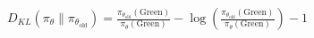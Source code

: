 \documentclass[preview]{standalone}
\begin{document}
\begin{align*}
D_{KL}\left(\pi_\theta \parallel \pi_{\theta_{\text{old}}}\right) = \frac{\pi_{\theta_{\text{old}}}(\text{Green})}{\pi_\theta(\text{Green})} - \log\left(\frac{\pi_{\theta_{\text{old}}}(\text{Green})}{\pi_\theta(\text{Green})}\right) - 1
\end{align*}
\end{document}
